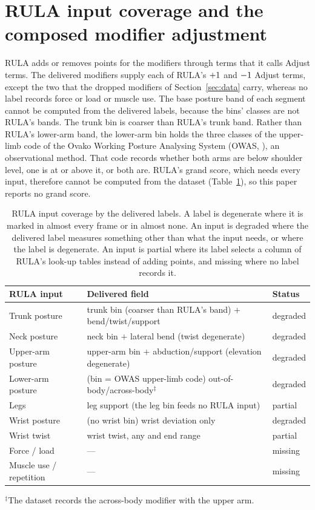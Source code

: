 \documentclass[review,3p,authoryear]{elsarticle}
\begin{document}
\appendix

\section{RULA input coverage and the composed modifier adjustment}
\label{app:rula}
\setcounter{table}{0}

RULA adds or removes points for the modifiers through terms that it calls Adjust terms.
The delivered modifiers supply each of RULA's $+1$ and $-1$
Adjust terms, except the two that the dropped modifiers of Section~\ref{sec:data} carry,
whereas no label records force or load or muscle use. The base posture band of each segment cannot be computed from the delivered labels,
because the bins' classes are not RULA's bands. The trunk bin is coarser than RULA's trunk
band. Rather than RULA's lower-arm band, the lower-arm bin holds
the three classes of the upper-limb code of the Ovako Working Posture Analysing System
(OWAS, \citealp{karhu1977owas}), an observational method. That code records whether both
arms are below shoulder level, one is at or above it, or both are. RULA's grand score, which
needs every input, therefore cannot be computed from the dataset (Table~\ref{tab:coverage}),
so this paper reports no grand score.

\begin{table}[!ht]
\centering
\caption{RULA input coverage by the delivered labels. A label is degenerate where it is
marked in almost every frame or in almost none. An input is degraded where the delivered
label measures something other than what the input needs, or where the label is
degenerate. An input is partial where its label
selects a column of RULA's look-up tables instead of adding points, and missing where no
label records it.}
\label{tab:coverage}
\small
\begin{tabular}{lll}
\toprule
RULA input & Delivered field & Status \\
\midrule
Trunk posture & trunk bin (coarser than RULA's band) $+$ bend/twist/support & degraded \\
Neck posture & neck bin $+$ lateral bend (twist degenerate) & degraded \\
Upper-arm posture & upper-arm bin $+$ abduction/support (elevation degenerate) & degraded \\
Lower-arm posture & (bin = OWAS upper-limb code) out-of-body/across-body$^\ddagger$ & degraded \\
Legs & leg support (the leg bin feeds no RULA input) & partial \\
Wrist posture & (no wrist bin) wrist deviation only & degraded \\
Wrist twist & wrist twist, any and end range & partial \\
Force / load & --- & missing \\
Muscle use / repetition & --- & missing \\
\bottomrule
\end{tabular}

\smallskip
{\footnotesize\raggedright $^\ddagger$The dataset records the across-body modifier with the
upper arm.\par}
\end{table}
\end{document}

